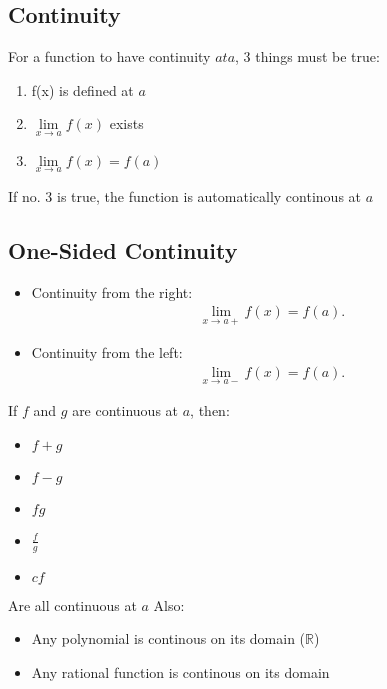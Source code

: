 \documentclass{report}
\begin{document}
      \pagebreak \bigbreak \noindent
      \subsection{Continuity}
      \bigbreak \noindent \bigbreak \noindent
      For a function to have continuity $at a$, 3 things must be true:
      \begin{enumerate}
        \item f(x) is defined at $a$
        \item $\lim\limits_{x \to a}{f(x)}$ exists
        \item $\lim\limits_{x \to a}{f(x) = f(a)} $
      \end{enumerate}
      If no. 3 is true, the function is automatically continous at $a$

      \bigbreak \noindent \bigbreak \noindent 
      \subsection{One-Sided Continuity}
      \begin{itemize}
        \item Continuity from the right:
          \begin{align*}
            \lim\limits_{x \to a+}{f(x)=f(a)}
          .\end{align*}
        \item Continuity from the left:
          \begin{align*}
            \lim\limits_{x \to a-}{f(x)=f(a)}
          .\end{align*}
      \end{itemize}
      \bigbreak \noindent \bigbreak \noindent
      If $f$ and $g $ are continuous at $a $, then:
      \begin{itemize}
        \item $f+g $
        \item $f-g $
        \item $fg $
        \item $\frac{f}{g} $
        \item $cf $
      \end{itemize}
      \bigbreak \noindent 
      Are all continuous at $a $
      \bigbreak \noindent \bigbreak \noindent
      Also:
      \begin{itemize}
        \item Any polynomial is continous on its domain ($ \mathbb{R} $)
        \item Any rational function is continous on its domain
      \end{itemize}
      \bigbreak \noindent \bigbreak \noindent
\end{document}
